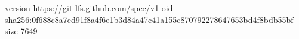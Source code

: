 version https://git-lfs.github.com/spec/v1
oid sha256:0f688c8a7ed91f8a4f6e1b3d84a47c41a155c870792278647653bd4f8bdb55bf
size 7649
